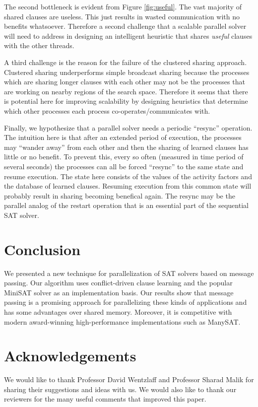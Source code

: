 \documentclass[letterpaper, compsoc, conference]{IEEEtran}
\begin{document}
The second bottleneck is evident from Figure \ref{fig:useful}. The vast
majority of shared clauses are useless. This just results in wasted communication
with no benefits whatsoever. Therefore a second challenge that a scalable
parallel solver will need to address in designing an intelligent heuristic
that shares \emph{useful} clauses with the other threads.

A third challenge is the reason for the failure of the clustered sharing
approach. Clustered sharing underperforms simple broadcast sharing because the
processes which are sharing longer clauses with each other may not be the
processes that are working on nearby regions of the search space. Therefore
it seems that there is potential here for improving scalability by
designing heuristics that determine which other processes each process
co-operates/communicates with.

Finally, we hypothesize that a parallel solver needs a periodic ``resync''
operation. The intuition here is that after an extended period of execution,
the processes may ``wander away'' from each other and then the sharing of
learned clauses has little or no benefit. To prevent this, every so often
(measured in time period of several seconds) the processes can all be forced
``resync'' to the same state and resume execution. The state here consists of
the values of the activity factors and the database of learned clauses.
Resuming execution from this common state will probably result in sharing
becoming benefical again. The resync may be the parallel analog of the restart
operation that is an essential part of the sequential SAT solver.

\section{Conclusion}
\label{sec:finish}

We presented a new technique for parallelization of SAT solvers based
on message passing. Our algorithm uses conflict-driven clause learning 
and the popular MiniSAT solver as an implementation basis. Our results show that 
message passing is a promising approach for parallelizing these kinds of 
applications and has some advantages over shared memory. Moreover, it is
competitive with modern award-winning high-performance implementations such as ManySAT.

\section*{Acknowledgements}
We would like to thank Professor David Wentzlaff and Professor Sharad Malik for
sharing their suggestions and ideas with us. We would also like to thank our
reviewers for the many useful comments that improved this paper.

\footnotesize{


}
\end{document}
